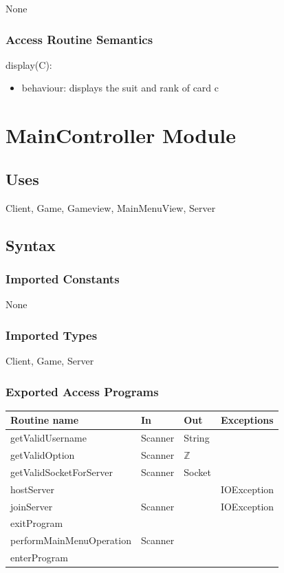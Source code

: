 \documentclass[12pt, titlepage]{article}
\begin{document}
None

\subsubsection* {Access Routine Semantics}

\noindent display(C):
\begin{itemize}
\item behaviour: displays the suit and rank of card c
\end{itemize}


\section* {MainController Module}
    \subsection* {Uses}
        Client, Game, Gameview, MainMenuView, Server
    \subsection* {Syntax}
    
        \subsubsection* {Imported Constants}
            None
        \subsubsection* {Imported Types}
            Client, Game, Server
        \subsubsection* {Exported Access Programs}
        
        \begin{tabular}{| l | l | l | p{5cm} |}
            \hline
            \textbf{Routine name} & \textbf{In} & \textbf{Out} & \textbf{Exceptions}\\
            \hline
            getValidUsername & Scanner & String &\\
            \hline
            getValidOption & Scanner & $\mathbb{Z}$ &\\
            \hline 
            getValidSocketForServer & Scanner & Socket &\\
            \hline 
            hostServer & & & IOException\\
            \hline 
            joinServer & Scanner & & IOException\\
            \hline 
            exitProgram & & &\\
            \hline 
            performMainMenuOperation & Scanner & &\\
            \hline 
            enterProgram & & &\\
            \hline 
        \end{tabular}
        
\end{document}
